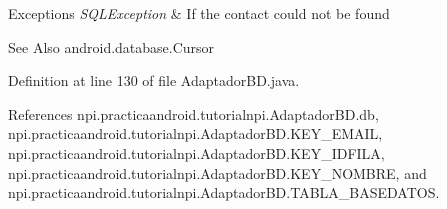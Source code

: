 \begin{DoxyExceptions}{Exceptions}
{\em S\-Q\-L\-Exception} & If the contact could not be found \\
\hline
\end{DoxyExceptions}
\begin{DoxySeeAlso}{See Also}
android.\-database.\-Cursor 
\end{DoxySeeAlso}


Definition at line 130 of file Adaptador\-B\-D.\-java.



References npi.\-practicaandroid.\-tutorialnpi.\-Adaptador\-B\-D.\-db, npi.\-practicaandroid.\-tutorialnpi.\-Adaptador\-B\-D.\-K\-E\-Y\-\_\-\-E\-M\-A\-I\-L, npi.\-practicaandroid.\-tutorialnpi.\-Adaptador\-B\-D.\-K\-E\-Y\-\_\-\-I\-D\-F\-I\-L\-A, npi.\-practicaandroid.\-tutorialnpi.\-Adaptador\-B\-D.\-K\-E\-Y\-\_\-\-N\-O\-M\-B\-R\-E, and npi.\-practicaandroid.\-tutorialnpi.\-Adaptador\-B\-D.\-T\-A\-B\-L\-A\-\_\-\-B\-A\-S\-E\-D\-A\-T\-O\-S.


